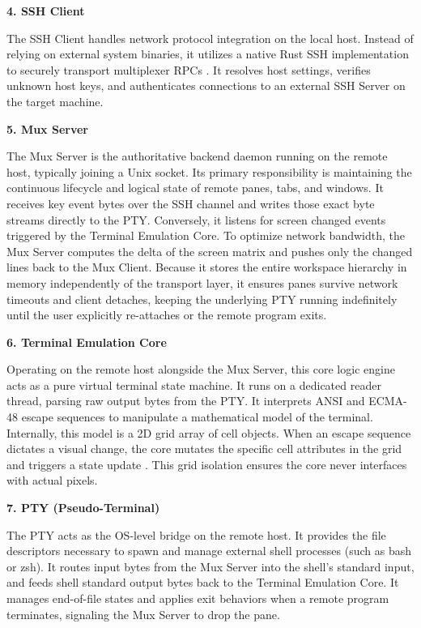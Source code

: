 \textbf{4. SSH Client}

The SSH Client handles network protocol integration on the local host. Instead of relying on external system binaries, it utilizes a native Rust SSH implementation to securely transport multiplexer RPCs \cite{ssh-crate}. It resolves host settings, verifies unknown host keys, and authenticates connections to an external SSH Server on the target machine.

\textbf{5. Mux Server}

The Mux Server is the authoritative backend daemon running on the remote host, typically joining a Unix socket. Its primary responsibility is maintaining the continuous lifecycle and logical state of remote panes, tabs, and windows. It receives key event bytes over the SSH channel and writes those exact byte streams directly to the PTY. Conversely, it listens for screen changed events triggered by the Terminal Emulation Core. To optimize network bandwidth, the Mux Server computes the delta of the screen matrix and pushes only the changed lines back to the Mux Client. Because it stores the entire workspace hierarchy in memory independently of the transport layer, it ensures panes survive network timeouts and client detaches, keeping the underlying PTY running indefinitely until the user explicitly re-attaches or the remote program exits.

\textbf{6. Terminal Emulation Core}

Operating on the remote host alongside the Mux Server, this core logic engine acts as a pure virtual terminal state machine. It runs on a dedicated reader thread, parsing raw output bytes from the PTY. It interprets ANSI and ECMA-48 escape sequences to manipulate a mathematical model of the terminal. Internally, this model is a 2D grid array of cell objects. When an escape sequence dictates a visual change, the core mutates the specific cell attributes in the grid and triggers a state update \cite{term-crate}. This grid isolation ensures the core never interfaces with actual pixels.

\textbf{7. PTY (Pseudo-Terminal)}

The PTY acts as the OS-level bridge on the remote host. It provides the file descriptors necessary to spawn and manage external shell processes (such as bash or zsh). It routes input bytes from the Mux Server into the shell's standard input, and feeds shell standard output bytes back to the Terminal Emulation Core. It manages end-of-file states and applies exit behaviors when a remote program terminates, signaling the Mux Server to drop the pane.

